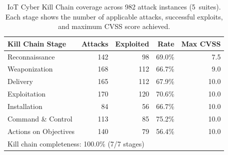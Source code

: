 \begin{table}[t]
\centering
\caption{IoT Cyber Kill Chain coverage across 982 attack instances (5~suites). Each stage shows the number of applicable attacks, successful exploits, and maximum CVSS score achieved.}
\label{tab:kill-chain}
\small
\begin{tabular}{l r r r r}
\toprule
\textbf{Kill Chain Stage} & \textbf{Attacks} & \textbf{Exploited} & \textbf{Rate} & \textbf{Max CVSS} \\
\midrule
Reconnaissance        & 142 &  98 & 69.0\% &  7.5 \\
Weaponization         & 168 & 112 & 66.7\% &  9.0 \\
Delivery              & 165 & 112 & 67.9\% & 10.0 \\
Exploitation          & 170 & 120 & 70.6\% & 10.0 \\
Installation          &  84 &  56 & 66.7\% & 10.0 \\
Command \& Control    & 113 &  85 & 75.2\% & 10.0 \\
Actions on Objectives & 140 &  79 & 56.4\% & 10.0 \\
\midrule
\multicolumn{5}{l}{\footnotesize Kill chain completeness: 100.0\% (7/7 stages)} \\
\bottomrule
\end{tabular}
\end{table}